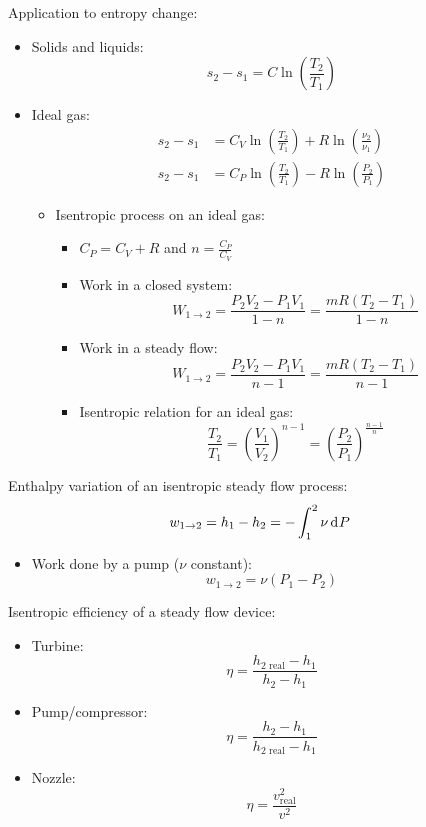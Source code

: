 \documentclass[10pt, twocolumn]{article}
\begin{document}
Application to entropy change:
\begin{itemize}
  \item Solids and liquids:
        \[
          s_2 - s_1 = C\ln{\left( \frac{T_2 }{T_1 } \right)}
        \]
  \item Ideal gas:
        \begin{align*}
          s_2 - s_1 & = C_V \ln{\left( \frac{T_2 }{T_1 } \right)} + R\ln{\left( \frac{\nu_2 }{\nu_1 } \right)} \\
          s_2 - s_1 & = C_P \ln{\left( \frac{T_2 }{T_1 } \right)} - R\ln{\left( \frac{P_2 }{P_1 } \right)}
        \end{align*}
        \begin{itemize}
          \item Isentropic process on an ideal gas:
                \begin{itemize}
                  \item \(C_P = C_V + R\) and \(n = \frac{C_P }{C_V }\)
                  \item Work in a closed system:
                        \[
                          W_{1 \rightarrow 2} = \frac{P_2 V_2 - P_1 V_1 }{1 - n} = \frac{mR\left( T_2 - T_1 \right)}{1 - n}
                        \]
                  \item Work in a steady flow:
                        \[
                          W_{1 \rightarrow 2} = \frac{P_2 V_2 - P_1 V_1 }{n - 1} = \frac{mR\left( T_2 - T_1 \right)}{n - 1}
                        \]
                  \item Isentropic relation for an ideal gas:
                        \[
                          \frac{T_2 }{T_1 } = \left( \frac{V_1 }{V_2 } \right)^{n - 1} = \left( \frac{P_2 }{P_1 } \right)^{\frac{n - 1}{n}}
                        \]
                \end{itemize}
        \end{itemize}
\end{itemize}

Enthalpy variation of an isentropic steady flow process:
\[
  w_{1 \rightarrow 2} = h_1 - h_2 = - \int_1 ^2 {\nu\,\mathrm{d}^{} P}
\]
\begin{itemize}
  \item Work done by a pump (\(\nu\) constant):
        \[
          w_{1 \rightarrow 2} = \nu\left( P_1 - P_2 \right)
        \]
\end{itemize}

Isentropic efficiency of a steady flow device:
\begin{itemize}
  \item Turbine:
        \[
          \eta = \frac{h_{2 \text{ real}} - h_1 }{h_2 - h_1 }
        \]
  \item Pump/compressor:
        \[
          \eta = \frac{h_2 - h_1 }{h_{2 \text{ real}} - h_1 }
        \]
  \item Nozzle:
        \[
          \eta = \frac{v_{\mathrm{real}}^2 }{v^2 }
        \]
\end{itemize}
\end{document}
